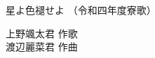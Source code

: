 \documentclass[10pt,b5j]{tarticle} %
\begin{document}
\begin{minipage}[c]{0.7\hsize} %
    \begin{center}
        {\LARGE
            星よ色褪せよ %
        }
        {\small 
            （令和四年度寮歌） %
        }
    \end{center}
\end{minipage}
\begin{minipage}[c]{0.3\hsize} %
    \begin{flushright} %
        上野颯太君 作歌\\渡辺麗菜君 作曲 %
    \end{flushright}
\end{minipage}
\end{document}
